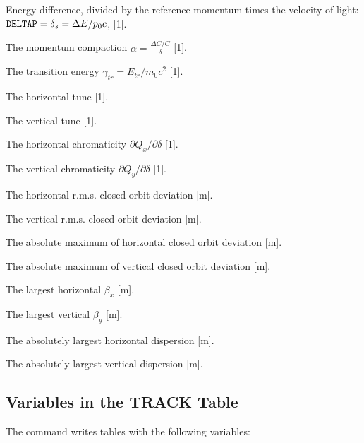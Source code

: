 \begin{mylist}
Energy difference,
divided by the reference momentum times the velocity of light:
\(\hbox{\tt DELTAP}=\delta_s =\Delta E/p_{0}c\), [1].
 
The momentum compaction \(\alpha = \frac{\Delta C /C}{\delta}\) [1].
 
The transition energy \(\gamma_{tr} = E_{tr} / m_0c^2\) [1].
 
The horizontal tune [1].
 
The vertical tune [1].
 
The horizontal chromaticity \(\partial Q_x / \partial \delta\) [1].
 
The vertical chromaticity \(\partial Q_y / \partial \delta\) [1].
 
The horizontal r.m.s. closed orbit deviation [m].
 
The vertical r.m.s. closed orbit deviation [m].
 
The absolute maximum of horizontal closed orbit deviation [m].
 
The absolute maximum of vertical closed orbit deviation [m].
 
The largest horizontal \(\beta_x\) [m].
 
The largest vertical \(\beta_y\) [m].
 
The absolutely largest horizontal dispersion [m].
 
The absolutely largest vertical dispersion [m].
\end{mylist}
 
\subsection{Variables in the TRACK Table}
\label{S-TRTAB}
The command  writes tables with the following variables:
 
